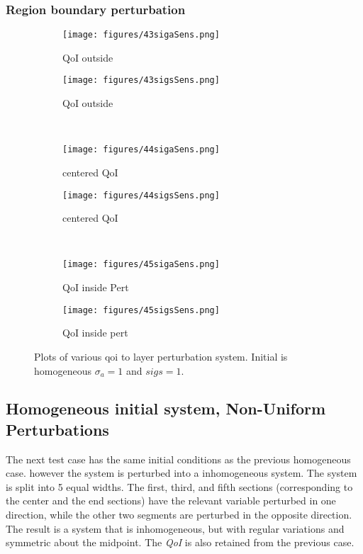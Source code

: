 \documentclass{article}
\newcommand{\siga}{\sigma_a}
\newcommand{\qoi}{{\it QoI}\xspace}
\begin{document}
\subsubsection{Region boundary perturbation}
\begin{figure}[H]
\label{Boundaries}
\centering
\begin{subfigure}{.5\textwidth}
  \centering
  \texttt{[image: figures/43sigaSens.png]}
  \caption{QoI outside}
  \label{fig:sfig1}
\end{subfigure}%
\begin{subfigure}{.5\textwidth}
  \centering
  \texttt{[image: figures/43sigsSens.png]}
  \caption{QoI outside}
  \label{fig:sfig4}
\end{subfigure}%
\\
\begin{subfigure}{.5\textwidth}
  \centering
  \texttt{[image: figures/44sigaSens.png]}
  \caption{centered QoI}
  \label{fig:sfig2}
\end{subfigure}%
\begin{subfigure}{.5\textwidth}
  \centering
  \texttt{[image: figures/44sigsSens.png]}
  \caption{centered QoI}
  \label{fig:sfig5}
\end{subfigure}%
\\
\begin{subfigure}{.5\textwidth}
  \centering
  \texttt{[image: figures/45sigaSens.png]}
  \caption{QoI inside Pert}
  \label{fig:sfig3}
\end{subfigure}%
\begin{subfigure}{.5\textwidth}
  \centering
  \texttt{[image: figures/45sigsSens.png]}
  \caption{QoI inside pert}
  \label{fig:sfig6}
\end{subfigure}%
\caption{Plots of various qoi to layer perturbation system. Initial is homogeneous $\siga=1$ and $sigs=1$.}
\label{fig:fig}
\end{figure}

\subsection{Homogeneous initial system, Non-Uniform Perturbations}

The next test case has the same initial conditions as the previous homogeneous case. however the system is perturbed into a inhomogeneous system. The system is split into 5 equal widths. The first, third, and fifth sections (corresponding to the center and the end sections) have the relevant variable perturbed in one direction, while the other two segments are perturbed in the opposite direction. The result is a system that is inhomogeneous, but with regular variations and symmetric about the midpoint. The \qoi is also retained from the previous case.
\end{document}
